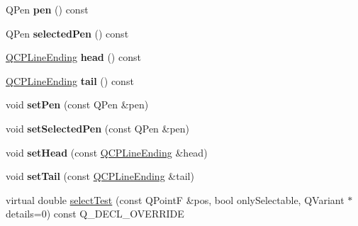 \begin{DoxyCompactItemize}
\item 
Q\+Pen {\bfseries pen} () const \hypertarget{class_q_c_p_item_curve_abc6321e55a9ba1a0c7df407843dfa252}{}\label{class_q_c_p_item_curve_abc6321e55a9ba1a0c7df407843dfa252}

\item 
Q\+Pen {\bfseries selected\+Pen} () const \hypertarget{class_q_c_p_item_curve_abd8b8be5b13bc4dafec4c1758c281336}{}\label{class_q_c_p_item_curve_abd8b8be5b13bc4dafec4c1758c281336}

\item 
\hyperlink{class_q_c_p_line_ending}{Q\+C\+P\+Line\+Ending} {\bfseries head} () const \hypertarget{class_q_c_p_item_curve_afc067f0d1e60cd04812f2c2c7fdf36c3}{}\label{class_q_c_p_item_curve_afc067f0d1e60cd04812f2c2c7fdf36c3}

\item 
\hyperlink{class_q_c_p_line_ending}{Q\+C\+P\+Line\+Ending} {\bfseries tail} () const \hypertarget{class_q_c_p_item_curve_a9adddfcc5275be0cf27e3c0c31c37c1a}{}\label{class_q_c_p_item_curve_a9adddfcc5275be0cf27e3c0c31c37c1a}

\item 
void {\bfseries set\+Pen} (const Q\+Pen \&pen)\hypertarget{class_q_c_p_item_curve_a034be908440aec785c34b92843461221}{}\label{class_q_c_p_item_curve_a034be908440aec785c34b92843461221}

\item 
void {\bfseries set\+Selected\+Pen} (const Q\+Pen \&pen)\hypertarget{class_q_c_p_item_curve_a375b917669f868c5a106bf2f1ab7c26d}{}\label{class_q_c_p_item_curve_a375b917669f868c5a106bf2f1ab7c26d}

\item 
void {\bfseries set\+Head} (const \hyperlink{class_q_c_p_line_ending}{Q\+C\+P\+Line\+Ending} \&head)\hypertarget{class_q_c_p_item_curve_a08a30d9cdd63995deea3d9e20430676f}{}\label{class_q_c_p_item_curve_a08a30d9cdd63995deea3d9e20430676f}

\item 
void {\bfseries set\+Tail} (const \hyperlink{class_q_c_p_line_ending}{Q\+C\+P\+Line\+Ending} \&tail)\hypertarget{class_q_c_p_item_curve_ac3488d8b1a6489c845dc5bff3ef71124}{}\label{class_q_c_p_item_curve_ac3488d8b1a6489c845dc5bff3ef71124}

\item 
virtual double \hyperlink{class_q_c_p_item_curve_a3633c02c3d753081ca26debd92f6cf3a}{select\+Test} (const Q\+PointF \&pos, bool only\+Selectable, Q\+Variant $\ast$details=0) const Q\+\_\+\+D\+E\+C\+L\+\_\+\+O\+V\+E\+R\+R\+I\+DE
\end{DoxyCompactItemize}
